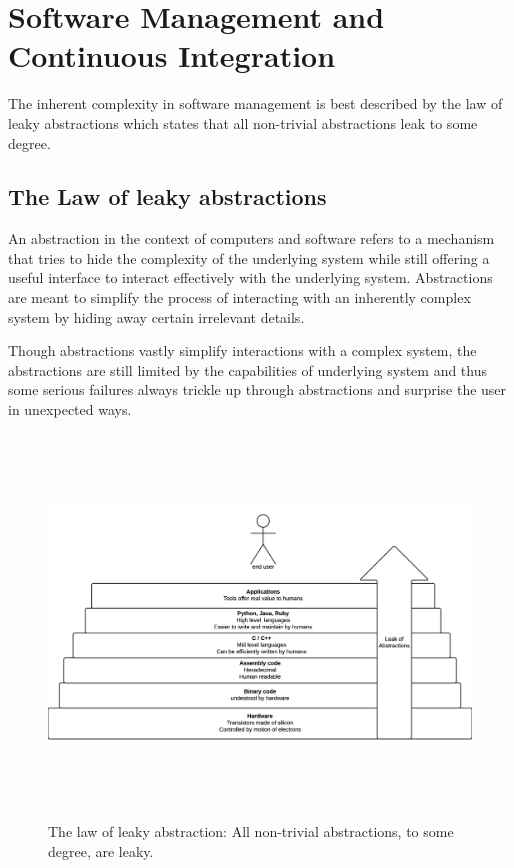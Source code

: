 \section*{Software Management and Continuous Integration}

The inherent complexity in software management is best described by the law of leaky abstractions \cite{spolsky_law_2002} which states that all non-trivial abstractions leak to some degree. 

\subsection*{The Law of leaky abstractions}

An abstraction in the context of computers and software refers to a mechanism that tries to hide the complexity of the underlying system while still offering a useful interface to interact effectively with the underlying system. Abstractions are meant to simplify the process of interacting with an inherently complex system by hiding away certain irrelevant details.

Though abstractions vastly simplify interactions with a complex system, the abstractions are still limited by the capabilities of underlying system and  thus some serious failures always trickle up through abstractions and surprise the user in unexpected ways.

\begin{figure}
  \centering
  \includegraphics[height=4in]{leakyabstraction}
  \caption{The law of leaky abstraction: All non-trivial abstractions, to some degree, are leaky.}
  \label{leakyabstraction}
\end{figure}

